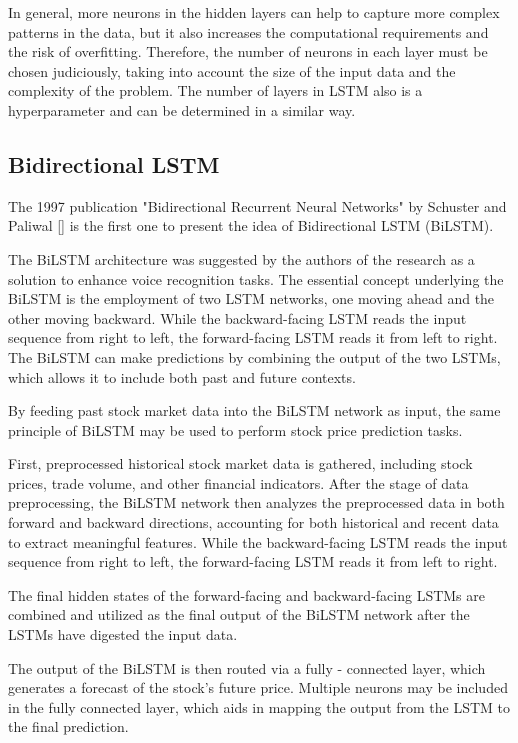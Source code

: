 \documentclass[a4paper]{article}
\begin{document}
In general, more neurons in the hidden layers can help to capture more complex patterns in the data, but it also increases the computational requirements and the risk of overfitting. Therefore, the number of neurons in each layer must be chosen judiciously, taking into account the size of the input data and the complexity of the problem. The number of layers in LSTM also is a hyperparameter and can be determined in a similar way.
\subsection{Bidirectional LSTM}

The 1997 publication "Bidirectional Recurrent Neural Networks" by Schuster and Paliwal [\cite{schuster1997bidirectional}] is the first one to present the idea of Bidirectional LSTM (BiLSTM).

The BiLSTM architecture was suggested by the authors of the research as a solution to enhance voice recognition tasks. The essential concept underlying the BiLSTM is the employment of two LSTM networks, one moving ahead and the other moving backward. While the backward-facing LSTM reads the input sequence from right to left, the forward-facing LSTM reads it from left to right. The BiLSTM can make predictions by combining the output of the two LSTMs, which allows it to include both past and future contexts.

By feeding past stock market data into the BiLSTM network as input, the same principle of BiLSTM may be used to perform stock price prediction tasks.

First, preprocessed historical stock market data is gathered, including stock prices, trade volume, and other financial indicators. After the stage of data preprocessing, the BiLSTM network then analyzes the preprocessed data in both forward and backward directions, accounting for both historical and recent data to extract meaningful features. While the backward-facing LSTM reads the input sequence from right to left, the forward-facing LSTM reads it from left to right.

The final hidden states of the forward-facing and backward-facing LSTMs are combined and utilized as the final output of the BiLSTM network after the LSTMs have digested the input data.

The output of the BiLSTM is then routed via a fully - connected layer, which generates a forecast of the stock's future price. Multiple neurons may be included in the fully connected layer, which aids in mapping the output from the LSTM to the final prediction.
\end{document}
